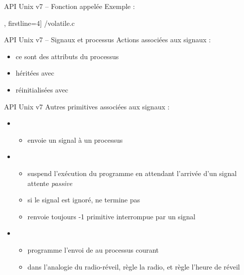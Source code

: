 \begin {frame} {API Unix v7 -- Fonction appelée}
    Exemple :

    \fD\lstmonstyle, firstline=4] {\inc/volatile.c}

\end {frame}

\begin {frame} {API Unix v7 -- Signaux et processus}
    Actions associées aux signaux :
    \begin {itemize}
	\item ce sont des attributs du processus
	\item héritées avec 
	\item réinitialisées avec 
    \end {itemize}
\end {frame}

\begin {frame} {API Unix v7}
    Autres primitives associées aux signaux :

    \begin {itemize}
	\item {}

	    \begin {itemize}
		\item envoie un signal à un processus
	    \end {itemize}

	\item {}

	    \begin {itemize}
		\item suspend l'exécution du programme en attendant
		    l'arrivée d'un signal \implique attente \textit{passive}

		\item si le signal est ignoré,  ne
		    termine pas

		\item {} renvoie toujours -1 \implique
		    primitive interrompue par un signal

	    \end {itemize}

	\item {}

	    \begin {itemize}
		\item programme l'envoi de 
		    au processus courant
		\item dans l'analogie du radio-réveil, 
		    règle la radio, et  règle l'heure
		    de réveil

	    \end {itemize}

    \end {itemize}
\end {frame}

